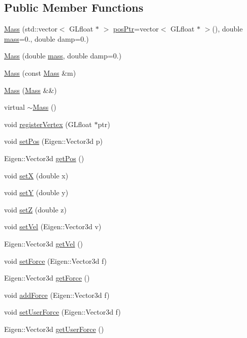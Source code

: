 \subsection*{Public Member Functions}
\begin{DoxyCompactItemize}
\item 
\hyperlink{classMass_a93c1c52a88d9993644df8b458cacc8ec}{Mass} (std\+::vector$<$ G\+Lfloat $\ast$ $>$ \hyperlink{classMass_abfd5e8aa50988458d702763a48cb438e}{pos\+Ptr}=vector$<$ G\+Lfloat $\ast$ $>$(), double \hyperlink{classMass_a8f37b93ded277000424b7a92adcf9c30}{mass}=0., double damp=0.)
\item 
\hyperlink{classMass_a4a736155e9f5a484a53705eec56cb282}{Mass} (double \hyperlink{classMass_a8f37b93ded277000424b7a92adcf9c30}{mass}, double damp=0.)
\item 
\hyperlink{classMass_a13584c6157ece49918e644fc2717a7b5}{Mass} (const \hyperlink{classMass}{Mass} \&m)
\item 
\hyperlink{classMass_af1d7e68513a6eb81c1b809583d67fb53}{Mass} (\hyperlink{classMass}{Mass} \&\&)
\item 
virtual \hyperlink{classMass_acbfdfe607e64d1bb2f35ca89900c7136}{$\sim$\+Mass} ()
\item 
void \hyperlink{classMass_acef363ddd9f0f5a42e9d5fe019f5de6c}{register\+Vertex} (G\+Lfloat $\ast$ptr)
\item 
void \hyperlink{classMass_af2b6c3c70c82b277214befdd67c2acbe}{set\+Pos} (Eigen\+::\+Vector3d p)
\item 
Eigen\+::\+Vector3d \hyperlink{classMass_ae07133ef0c5d62612a1126c0e002bd26}{get\+Pos} ()
\item 
void \hyperlink{classMass_a7f1db9674d10a9322f549ee5654a4569}{set\+X} (double x)
\item 
void \hyperlink{classMass_a29e53b261bc6f56cdbd34d458016a627}{set\+Y} (double y)
\item 
void \hyperlink{classMass_adf79327d78c04febb6609bdd1cb4f987}{set\+Z} (double z)
\item 
void \hyperlink{classMass_ac6e500296728680770485a6af1ac4419}{set\+Vel} (Eigen\+::\+Vector3d v)
\item 
Eigen\+::\+Vector3d \hyperlink{classMass_a10e11378951a3dfc97a5029d0b845133}{get\+Vel} ()
\item 
void \hyperlink{classMass_abc2739dab59a65aa3987c91fb010f84c}{set\+Force} (Eigen\+::\+Vector3d f)
\item 
Eigen\+::\+Vector3d \hyperlink{classMass_ab0b0f0e92be4a78dba625cac1e3f8337}{get\+Force} ()
\item 
void \hyperlink{classMass_ad7ec8fa0330bab09feaf536d07aaa1ea}{add\+Force} (Eigen\+::\+Vector3d f)
\item 
void \hyperlink{classMass_ac27a6878abc0caee4ec6af509ef36926}{set\+User\+Force} (Eigen\+::\+Vector3d f)
\item 
Eigen\+::\+Vector3d \hyperlink{classMass_ad295f54d0c63b72db44fc082d27ef1cc}{get\+User\+Force} ()
\end{DoxyCompactItemize}
